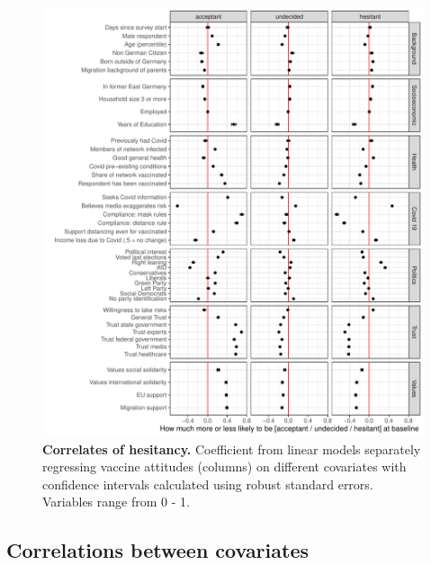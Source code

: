 \documentclass[12pt]{article}
\begin{document}

\begin{figure}[h!]
	\centering
	\includegraphics[width=1\linewidth]{figures/figure_7.pdf}
	\caption{\textbf{Correlates of hesitancy.} Coefficient from linear models separately regressing vaccine attitudes (columns) on different covariates with confidence intervals calculated using robust standard errors. Variables range from 0 - 1. }
	\label{correlates}
\end{figure}



\clearpage

\subsection{Correlations between covariates}
\end{document}
